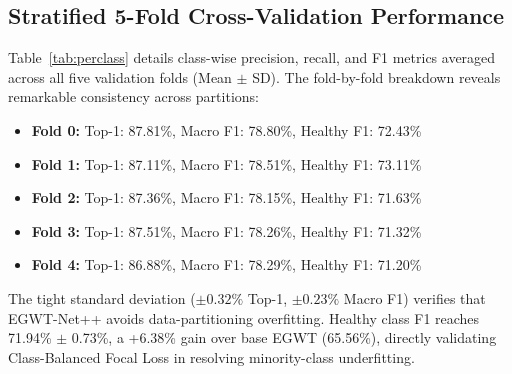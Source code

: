 \documentclass[conference]{IEEEtran}
\let\origsubsection\subsection
\renewcommand{\subsection}{\needspace{5\baselineskip}\origsubsection}
\begin{document}
\subsection{Stratified 5-Fold Cross-Validation Performance}
Table~\ref{tab:perclass} details class-wise precision, recall, and F1 metrics averaged across all five validation folds (Mean $\pm$ SD). The fold-by-fold breakdown reveals remarkable consistency across partitions:
\begin{itemize}
    \item \textbf{Fold 0:} Top-1: 87.81\%, Macro F1: 78.80\%, Healthy F1: 72.43\%
    \item \textbf{Fold 1:} Top-1: 87.11\%, Macro F1: 78.51\%, Healthy F1: 73.11\%
    \item \textbf{Fold 2:} Top-1: 87.36\%, Macro F1: 78.15\%, Healthy F1: 71.63\%
    \item \textbf{Fold 3:} Top-1: 87.51\%, Macro F1: 78.26\%, Healthy F1: 71.32\%
    \item \textbf{Fold 4:} Top-1: 86.88\%, Macro F1: 78.29\%, Healthy F1: 71.20\%
\end{itemize}
The tight standard deviation ($\pm 0.32\%$ Top-1, $\pm 0.23\%$ Macro F1) verifies that EGWT-Net++ avoids data-partitioning overfitting. Healthy class F1 reaches 71.94\% $\pm$ 0.73\%, a +6.38\% gain over base EGWT (65.56\%), directly validating Class-Balanced Focal Loss in resolving minority-class underfitting.
\end{document}
